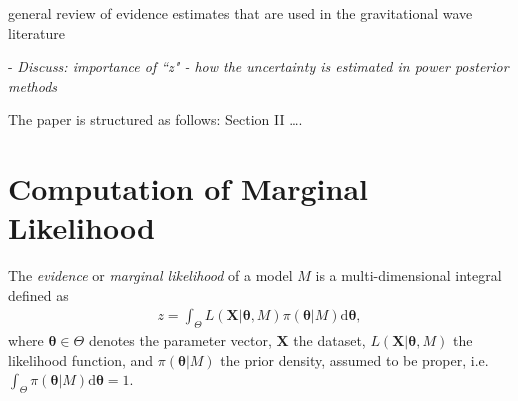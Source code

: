 \documentclass[aps,reprint,amsmath,amssymb,showpacs,showkeys]{revtex4-1}%
\newcommand{\cb}{ \color{blue}}
\begin{document}







{\cb
general review of evidence estimates that are used in the gravitational wave  literature\bigskip

- \textit{Discuss: importance of ``z"  
- how the uncertainty is estimated in power posterior methods}}


The paper is structured as follows: Section II \ldots.



\section{Computation of Marginal Likelihood}

The \textit{evidence} or \textit{marginal likelihood} of a model  $M$ is a multi-dimensional integral defined as
\begin{align}
\label{eq:z}
z = \int_{\Theta}L(\bm{X}|\bm{\theta},M)\pi(\bm{\theta}|M) \text{d} \bm{\theta},
\end{align}
where $\bm{\theta} \in \Theta$ denotes the parameter vector, $\bm{X}$ the dataset, $L(\bm{X}|\bm{\theta},M)$  the likelihood function, and $\pi(\bm{\theta}|M)$  the prior density, assumed to be proper, i.e.\ $ \int_{\Theta}\pi(\bm{\theta}|M) \text{d} \bm{\theta}=1$.
\end{document}
